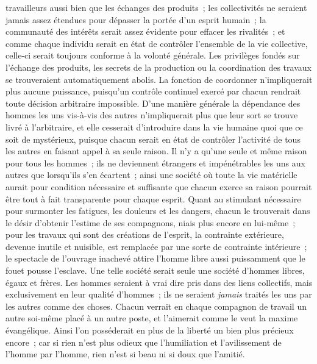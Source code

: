 \documentclass[french,twoside]{book} %
\begin{document}
travailleurs aussi bien que les échanges des produits ; les collectivités ne seraient jamais assez étendues pour dépasser la portée d'un esprit humain ; la communauté des intérêts serait assez évidente pour effacer les rivalités ; et comme chaque individu serait en état de contrôler l'ensemble de la vie collective, celle-ci serait toujours conforme à la volonté générale. Les privilèges fondés sur l'échange des produits, les secrets de la production ou la coordination des travaux se trouveraient automatiquement abolis. La fonction de coordonner n'impliquerait plus aucune puissance, puisqu'un contrôle continuel exercé par chacun rendrait toute décision arbitraire impossible. D'une manière générale la dépendance des hommes les uns vis-à-vis des autres n'impliquerait plus que leur sort se trouve livré à l'arbitraire, et elle cesserait d'introduire dans la vie humaine quoi que ce soit de mystérieux, puisque chacun serait en état de contrôler l'activité de tous les autres en faisant appel à sa seule raison. Il n'y a qu'une seule et même raison pour tous les hommes ; ils ne deviennent étrangers et impénétrables les uns aux autres que lorsqu'ils s'en écartent ; ainsi une société où toute la vie matérielle aurait pour condition nécessaire et suffisante que chacun exerce sa raison pourrait être tout à fait transparente pour chaque esprit. Quant au stimulant nécessaire pour surmonter les fatigues, les douleurs et les dangers, chacun le trouverait dans le désir d'obtenir l'estime de ses compagnons, niais plus encore en lui-même ; pour les travaux qui sont des créations de l'esprit, la contrainte extérieure, devenue inutile et nuisible, est remplacée par une sorte de contrainte intérieure ; le spectacle de l'ouvrage inachevé attire l'homme libre aussi puissamment que le fouet pousse l'esclave. Une telle société serait seule une société d'hommes libres, égaux et frères. Les hommes seraient à vrai dire pris dans des liens collectifs, mais exclusivement en leur qualité d'hommes ; ils ne seraient \emph{jamais} traités les uns par les autres comme des choses. Chacun verrait en chaque compagnon de travail un autre soi-même placé à un autre poste, et l'aimerait comme le veut la maxime évangélique. Ainsi l'on posséderait en plus de la liberté un bien plus précieux encore ; car si rien n'est plus odieux que l'humiliation et l'avilissement de l'homme par l'homme, rien n'est si beau ni si doux que l'amitié.\par
\end{document}
